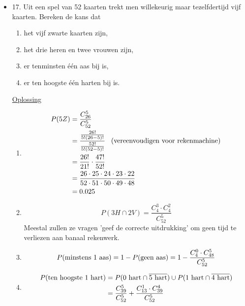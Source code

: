 \documentclass[12pt]{report}
\newcommand{\exercise}[2]{
  #1
  

  \underline{Oplossing}
  
  #2
  
    \hrulefill
}
\begin{document}
\begin{itemize}[label={}, leftmargin=*]
	\item \exercise{17. Uit een spel van 52 kaarten trekt men willekeurig maar tezelfdertijd vijf kaarten. Bereken de kans dat 
	      \begin{enumerate}
	      	\item het vijf zwarte kaarten zijn,
	      	\item het drie heren en twee vrouwen zijn,
	      	\item er tenminsten één aas bij is,
	      	\item er ten hoogste één harten bij is.
	      \end{enumerate}}{
	      \begin{enumerate}
	      	\item {
	      		\begin{equation*}
	      			\begin{split}
	      				P(5Z) & = \frac{C_{26}^{5}}{C_{52}^{5}}                     \\
	      				& = \frac{\frac{26!}{5!(26 - 5)!}}{\frac{52!}{5!(52 - 5)!}}\;\;\; \hbox{(vereenvoudigen voor rekenmachine)}\\
	      				& = \frac{26!}{21!} \cdot \frac{47!}{52!}                   \\
	      				& = \frac{26 \cdot 25 \cdot 24 \cdot 23 \cdot 22}{52 \cdot 51 \cdot 50 \cdot 49 \cdot 48} \\
	      				& = 0.025
	      			\end{split}
	      		\end{equation*}
	      	}
	      	\item {
	      		$$P(3H \cap 2V) = \frac{C_{4}^{3} \cdot C_{4}^{2}}{C_{52}^{5}}$$
	      		Meestal zullen ze vragen 'geef de correcte uitdrukking' om geen tijd te verliezen aan banaal rekenwerk.
	      	}
	      	\item {
	      		$$P(\hbox{minstens 1 aas}) = 1 - P(\hbox{geen aas}) = 1 - \frac{C_{4}^{0} \cdot C_{48}^{5}}{C_{52}^{5}}$$
	      	}
	      	\item {
	      		\begin{equation*}
	      			\begin{split}
	      				P(\hbox{ten hoogste 1 hart}) & = P(\hbox{0 hart} \cap \overline{\hbox{5 hart}}) \cup P(\hbox{1 hart} \cap \overline{\hbox{4 hart}})  \\
	      				& =  \frac{C_{39}^{5}}{C_{52}^{5}} + \frac{C_{13}^{1} \cdot C_{39}^{4}}{C_{52}^{5}}
	      			\end{split}
	      		\end{equation*}
	      	}
	      	   

\end{enumerate}}
\end{itemize}
\end{document}
